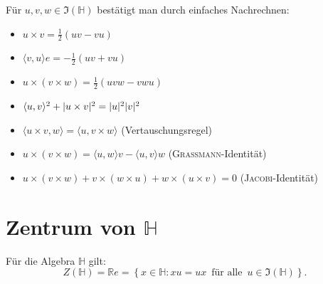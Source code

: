 \documentclass[aspectratio=169]{beamer}
\newcommand{\Ham}{\ensuremath{\mathbb{H}}{ }}
\newcommand{\R}{\ensuremath{\mathbb{R}}{ }}
\DeclarePairedDelimiter\abs{\lvert}{\rvert}
\begin{document}
    \begin{frame}
        Für \(u, v, w \in \Im(\Ham)\) bestätigt man durch einfaches Nachrechnen:
        \begin{itemize}
            \item
                \(u \times v = \frac{1}{2} (uv - vu)\)

            \item
                \(\langle v, u \rangle e = - \frac{1}{2} (uv + vu)\)

            \item
                \(u \times (v \times w) = \frac{1}{2} (uvw - vwu)\)

            \item
                \(\langle u, v \rangle^2 + \abs{u \times v}^2 = \abs{u}^2 \abs{v}^2\)

            \item
                \(\langle u \times v, w \rangle = \langle u, v \times w \rangle\) \hfill (Vertauschungsregel)

            \item
                \(u \times (v \times w) = \langle u, w \rangle v - \langle u, v \rangle w\) \hfill (\textsc{Grassmann}-Identität)

            \item
                \(u \times (v \times w) + v \times (w \times u) + w \times (u \times v) = 0\) \hfill (\textsc{Jacobi}-Identität)
        \end{itemize}
    \end{frame}

    \section{Zentrum von \(\mathbb{H}\)}
    \begin{frame}
        \begin{theorem}
            Für die Algebra \Ham gilt:
            \[
                Z \left( \Ham \right) = \R e = \left\{ x \in \Ham \colon xu = ux \,\text{ für alle }\, u \in \Im \left( \Ham \right) \right\}
            .\]
        \end{theorem}
    \end{frame}
\end{document}
